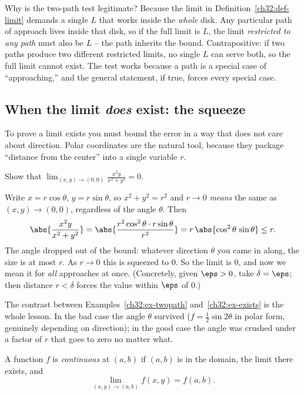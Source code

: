 \begin{whybox}
Why is the two-path test legitimate? Because the limit in
Definition~\ref{ch32:def-limit} demands a single $L$ that works inside the \emph{whole} disk.
Any particular path of approach lives inside that disk, so if the full limit is $L$, the limit
\emph{restricted to any path} must also be $L$ -- the path inherits the bound. Contrapositive:
if two paths produce two different restricted limits, no single $L$ can serve both, so the full
limit cannot exist. The test works because a path is a special case of ``approaching,'' and the
general statement, if true, forces every special case.
\end{whybox}

\subsection*{When the limit \emph{does} exist: the squeeze}

To prove a limit exists you must bound the error in a way that does not care about direction.
Polar coordinates are the natural tool, because they package ``distance from the center'' into a
single variable $r$.

\begin{example}
\label{ch32:ex-exists}
Show that $\displaystyle\lim_{(x,y)\to(0,0)} \frac{x^2 y}{x^2+y^2} = 0$.

Write $x=r\cos\theta$, $y=r\sin\theta$, so $x^2+y^2=r^2$ and $r\to 0$ \emph{means} the same as
$(x,y)\to(0,0)$, regardless of the angle $\theta$. Then
\[
   \abs{\frac{x^2 y}{x^2+y^2}}
   = \abs{\frac{r^2\cos^2\theta \cdot r\sin\theta}{r^2}}
   = r\,\abs{\cos^2\theta\,\sin\theta}
   \le r .
\]
The angle dropped out of the bound: whatever direction $\theta$ you came in along, the size is
at most $r$. As $r\to 0$ this is squeezed to $0$. So the limit is $0$, and now we mean it for
\emph{all} approaches at once. (Concretely, given $\eps>0$, take $\delta=\eps$; then distance
$r<\delta$ forces the value within $\eps$ of $0$.)
\end{example}

The contrast between Examples~\ref{ch32:ex-twopath} and~\ref{ch32:ex-exists} is the whole
lesson. In the bad case the angle $\theta$ survived ($f=\tfrac12\sin 2\theta$ in polar form,
genuinely depending on direction); in the good case the angle was crushed under a factor of
$r$ that goes to zero no matter what.

\begin{definition}[Continuity]
\label{ch32:def-continuity}
A function $f$ is \emph{continuous} at $(a,b)$ if $(a,b)$ is in the domain, the limit there
exists, and
\[
   \lim_{(x,y)\to(a,b)} f(x,y) = f(a,b).
\]
\end{definition}

